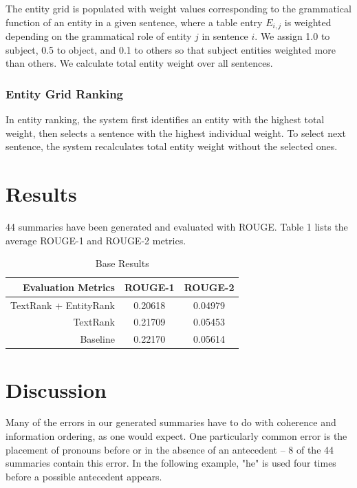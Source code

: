 \documentclass[11pt]{article}
\begin{document}
	The entity grid is populated with weight values corresponding to the grammatical function of an entity in a given sentence, where a table entry $E_{i,j}$ is weighted depending on the grammatical role of entity $j$ in sentence $i$. We assign 1.0 to subject, 0.5 to object, and 0.1 to others so that subject entities weighted more than others. We calculate total entity weight over all sentences.
	
	
	\subsubsection{Entity Grid Ranking}
	In entity ranking, the system first identifies an entity with the highest total weight, then selects a sentence with the highest individual weight. To select next sentence, the system recalculates total entity weight without the selected ones. 
	
	\section{Results}
	
	44 summaries have been generated and evaluated with ROUGE. Table 1 lists the average ROUGE-1 and ROUGE-2 metrics.
	
	\begin{table}[ht]
		\caption{Base Results} 
		\centering
		\begin{tabular}{r c c}
			\hline
			Evaluation Metrics & ROUGE-1 & ROUGE-2 \\
			\hline
			TextRank + EntityRank  & 0.20618 & 0.04979 \\			
			\hline
			TextRank          & 0.21709 & 0.05453 \\
			\hline
			Baseline          & 0.22170 & 0.05614 \\
			\hline
		\end{tabular}
	\end{table}
	
	\section{Discussion}
	
	Many of the errors in our generated summaries have to do with coherence and information ordering, as one would expect. One particularly common error is the placement of pronouns before or in the absence of an antecedent -- 8 of the 44 summaries contain this error. In the following example, "he" is used four times before a possible antecedent appears.\\
	
\end{document}
